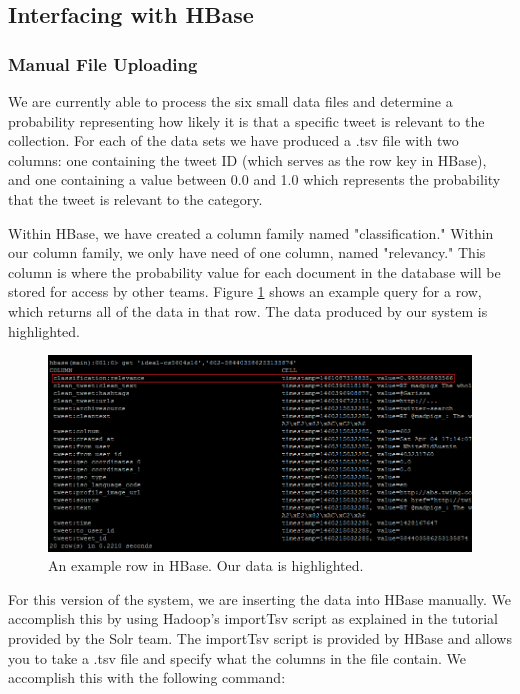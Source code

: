 \subsection{Interfacing with HBase}

\subsubsection{Manual File Uploading}

We are currently able to process the six small data files and determine a probability representing how likely it is that a specific tweet is relevant to the collection. For each of the data sets we have produced a .tsv file with two columns: one containing the tweet ID (which serves as the row key in HBase), and one containing a value between 0.0 and 1.0 which represents the probability that the tweet is relevant to the category. 

Within HBase, we have created a column family named "classification." Within our column family, we only have need of one column, named "relevancy." This column is where the probability value for each document in the database will be stored for access by other teams. Figure \ref{fig:hbase-data} shows an example query for a row, which returns all of the data in that row. The data produced by our system is highlighted.

\begin{figure}[ht]
	\centering
	\includegraphics[scale=.65]{figures/hbase-data.png}
    \caption{An example row in HBase. Our data is highlighted.}\label{fig:hbase-data}
\end{figure}

For this version of the system, we are inserting the data into HBase manually. We accomplish this by using Hadoop's importTsv script as explained in the tutorial provided by the Solr team. The importTsv script is provided by HBase and allows you to take a .tsv file and specify what the columns in the file contain. We accomplish this with the following command:

